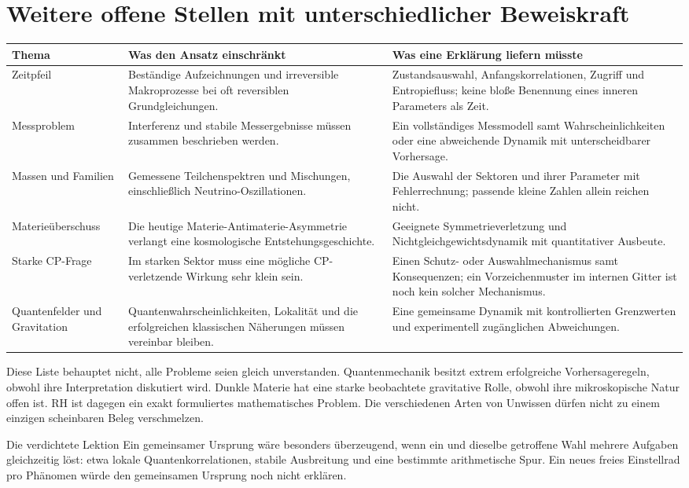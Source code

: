 \section{Weitere offene Stellen mit unterschiedlicher Beweiskraft}
\begin{longtable}{L{32mm}L{56mm}L{60mm}}
\toprule\textbf{Thema}&\textbf{Was den Ansatz einschränkt}&\textbf{Was eine Erklärung liefern müsste}\\\midrule\endhead
Zeitpfeil&Beständige Aufzeichnungen und irreversible Makroprozesse bei oft reversiblen Grundgleichungen.&Zustandsauswahl, Anfangskorrelationen, Zugriff und Entropiefluss; keine bloße Benennung eines inneren Parameters als Zeit.\\
Messproblem&Interferenz und stabile Messergebnisse müssen zusammen beschrieben werden.&Ein vollständiges Messmodell samt Wahrscheinlichkeiten oder eine abweichende Dynamik mit unterscheidbarer Vorhersage.\\
Massen und Familien&Gemessene Teilchenspektren und Mischungen, einschließlich Neutrino-Oszillationen.&Die Auswahl der Sektoren und ihrer Parameter mit Fehlerrechnung; passende kleine Zahlen allein reichen nicht.\\
Materieüberschuss&Die heutige Materie-Antimaterie-Asymmetrie verlangt eine kosmologische Entstehungsgeschichte.&Geeignete Symmetrieverletzung und Nichtgleichgewichtsdynamik mit quantitativer Ausbeute.\\
Starke CP-Frage&Im starken Sektor muss eine mögliche CP-verletzende Wirkung sehr klein sein.&Einen Schutz- oder Auswahlmechanismus samt Konsequenzen; ein Vorzeichenmuster im internen Gitter ist noch kein solcher Mechanismus.\\
Quantenfelder und Gravitation&Quantenwahrscheinlichkeiten, Lokalität und die erfolgreichen klassischen Näherungen müssen vereinbar bleiben.&Eine gemeinsame Dynamik mit kontrollierten Grenzwerten und experimentell zugänglichen Abweichungen.\\\bottomrule
\end{longtable}

Diese Liste behauptet nicht, alle Probleme seien gleich unverstanden. Quantenmechanik besitzt extrem erfolgreiche Vorhersageregeln, obwohl ihre Interpretation diskutiert wird. Dunkle Materie hat eine starke beobachtete gravitative Rolle, obwohl ihre mikroskopische Natur offen ist. RH ist dagegen ein exakt formuliertes mathematisches Problem. Die verschiedenen Arten von Unwissen dürfen nicht zu einem einzigen scheinbaren Beleg verschmelzen.

\begin{bild}{Die verdichtete Lektion}
Ein gemeinsamer Ursprung wäre besonders überzeugend, wenn ein und dieselbe getroffene Wahl mehrere Aufgaben gleichzeitig löst: etwa lokale Quantenkorrelationen, stabile Ausbreitung und eine bestimmte arithmetische Spur. Ein neues freies Einstellrad pro Phänomen würde den gemeinsamen Ursprung noch nicht erklären.
\end{bild}
